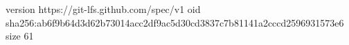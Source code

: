 version https://git-lfs.github.com/spec/v1
oid sha256:ab6f9b64d3d62b73014acc2df9ac5d30cd3837c7b81141a2cccd2596931573e6
size 61
